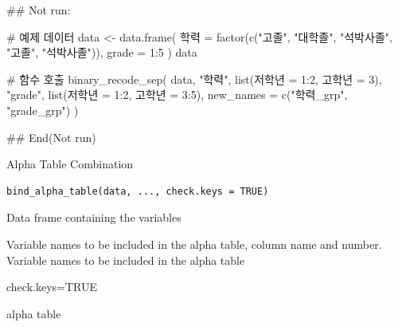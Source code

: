 \documentclass[a4paper]{book}
\begin{document}
\begin{Examples}
\begin{ExampleCode}


\#\# Not run: 




# 예제 데이터
data <- data.frame(
  학력 = factor(c("고졸", "대학졸", "석박사졸", "고졸", "석박사졸")),
  grade = 1:5
)
data


# 함수 호출
binary_recode_sep(  data,
                    "학력", list(저학년 = 1:2, 고학년 = 3),
                    "grade", list(저학년 = 1:2, 고학년 = 3:5),
                    new_names = c("학력_grp", "grade_grp")
)





## End(Not run)
\end{ExampleCode}
\end{Examples}
%
\begin{Description}
Alpha Table Combination
\end{Description}
%
\begin{Usage}
\begin{verbatim}
bind_alpha_table(data, ..., check.keys = TRUE)
\end{verbatim}
\end{Usage}
%
\begin{Arguments}
\begin{ldescription}
\item[\code{data}] Data frame containing the variables

\item[\code{...}] Variable names to be included in the alpha table, column name and number. Variable names to be included in the alpha table

\item[\code{check.keys}] check.keys=TRUE
\end{ldescription}
\end{Arguments}
%
\begin{Value}
alpha table
\end{Value}
%
\end{document}
